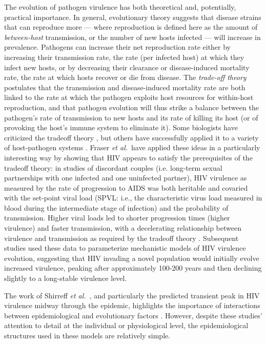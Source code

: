 \documentclass[10pt,letterpaper]{article}
\newcommand{\etal}{\textit{et al.}}
\begin{document}
The evolution of pathogen virulence has both 
theoretical and, potentially, practical
importance. In general, evolutionary theory suggests that
disease strains that can reproduce more --- where reproduction
is defined here as the amount of \emph{between-host} transmission, or
the number of new hosts infected --- will increase in prevalence.
Pathogens can increase their net reproduction rate either
by increasing their transmission rate, 
the rate (per infected host) at which they
infect new hosts, or by decreasing their clearance or disease-induced
mortality rate, the rate
at which hosts recover or die from disease.
The \emph{trade-off theory} \cite{alizon_virulence_2009} postulates that
the transmission and disease-induced mortality rate are both linked to the rate at which
the pathogen exploits host resources for within-host reproduction, 
and that pathogen
evolution will thus strike a balance between the
pathogen's rate of transmission
to new hosts and its rate of killing its host (or of provoking
the host's immune system to eliminate it).
Some biologists have criticized the tradeoff theory
\cite{EbertBull2003,alizon_adaptive_2015}, but others have
successfully applied it to a variety of host-pathogen systems \cite{Dwyer+1990,mackinnon1999genetic,jensen2006empirical,deroode2008virulence}.
Fraser \etal\ have applied these ideas in a particularly
interesting way 
by showing that HIV appears to satisfy the prerequisites of
the tradeoff theory: in studies of discordant couples (i.e. long-term
sexual partnerships with one infected and one uninfected partner), HIV
virulence as measured by the rate of progression to AIDS was 
both heritable and covaried with the set-point viral load (SPVL: i.e., the
characteristic virus load measured in blood during the intermediate
stage of infection) and the probability of transmission.
Higher viral loads led to shorter progression times (higher virulence)
and faster transmission, with a decelerating relationship
between virulence and transmission as required by the tradeoff theory
\cite{Fraser+2007,fraser_virulence_2014}. Subsequent studies
\cite{shirreff_transmission_2011,herbeck_hiv_2014,herbeck_evolution_2016} used these data to
parameterize mechanistic models of HIV virulence evolution, suggesting
that HIV invading a novel population would initially evolve increased
virulence, peaking after approximately 100-200 years and then declining
slightly to a long-stable virulence level.

The work of Shirreff \etal\ \cite{shirreff_transmission_2011}, and particularly the predicted transient peak in HIV virulence midway through the epidemic,
highlights the importance of interactions between epidemiological and
evolutionary factors \cite{day_virulence_2004,alizon_price_2009}.
However, despite these studies' attention to detail at the individual
or physiological level, the epidemiological structures used in these
models are relatively simple.
\end{document}
